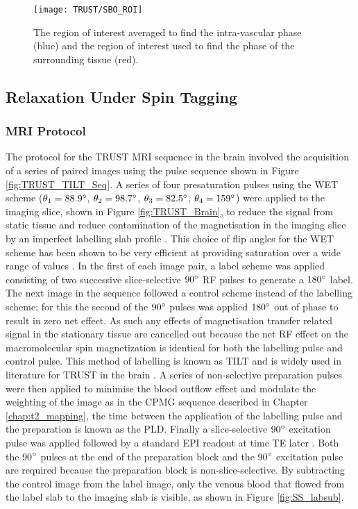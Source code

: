 \begin{figure}[H]
	\centering
	\texttt{[image: TRUST/SBO\_ROI]}
	\caption{The region of interest averaged to find the intra-vascular phase (blue) and the region of interest used to find the phase of the surrounding tissue (red).}
	\label{fig:SBO_ROI}	
\end{figure}


\subsection{\ttwo Relaxation Under Spin Tagging}

\subsubsection{\ac{MRI} Protocol}
\label{sec:TRUST_MRI}

The protocol for the \ac{TRUST} \ac{MRI} sequence in the brain involved the acquisition of a series of paired images using the pulse sequence shown in Figure \ref{fig:TRUST_TILT_Seq}. A series of four presaturation pulses using the \ac{WET} scheme ($\theta_1 = 88.9\degree$, $\theta_2 = 98.7\degree$, $\theta_3 = 82.5\degree$, $\theta_4 = 159\degree$) were applied to the imaging slice, shown in Figure \ref{fig:TRUST_Brain}, to reduce the signal from static tissue and reduce contamination of the magnetisation in the imaging slice by an imperfect labelling slab profile \cite{hendrikse_measurements_2003}. This choice of flip angles for the \ac{WET} scheme has been shown to be very efficient at providing saturation over a wide range of \tone values \cite{golay_pulsed_2005}. In the first of each image pair, a label scheme was applied consisting of two successive slice-selective $90\degree$ \ac{RF} pulses to generate a $180\degree$ label. The next image in the sequence followed a control scheme instead of the labelling scheme; for this the second of the $90\degree$ pulses was applied $180\degree$ out of phase to result in zero net effect. As such any effects of magnetisation transfer related signal in the stationary tissue are cancelled out because the net \ac{RF} effect on the macromolecular spin magnetization is identical for both the labelling pulse and control pulse. This method of labelling is known as \ac{TILT} and is widely used in literature for \ac{TRUST} in the brain \cite{golay_transfer_1999}. A series of non-selective \ttwo preparation pulses were then applied to minimise the blood outflow effect and modulate the \ttwo weighting of the image as in the \ac{CPMG} sequence described in Chapter \ref{chap:t2_mapping}, the time between the application of the labelling pulse and the \ttwo preparation is known as the \ac{PLD}. Finally a slice-selective $90\degree$ excitation pulse was applied followed by a standard \ac{EPI} readout at time \ac{TE} later \cite{xu_improving_2012}. Both the 90$\degree$ pulses at the end of the \ttwo preparation block and the 90$\degree$ excitation pulse are required because the \ttwo preparation block is non-slice-selective. By subtracting the control image from the label image, only the venous blood that flowed from the label slab to the imaging slab is visible, as shown in Figure \ref{fig:SS_labsub}.

